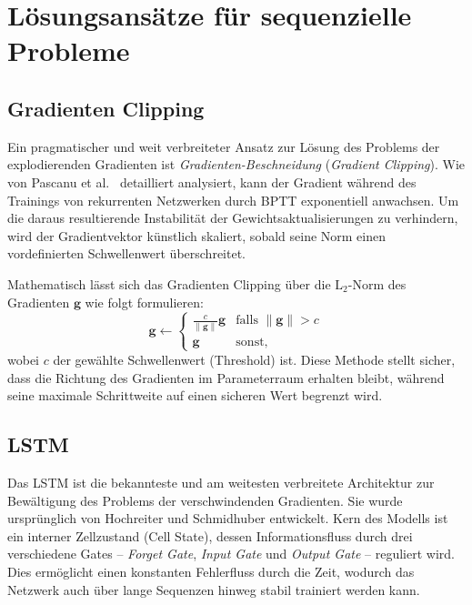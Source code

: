 \chapter{Lösungsansätze für sequenzielle Probleme}

\section{Gradienten Clipping}

Ein pragmatischer und weit verbreiteter Ansatz zur Lösung des Problems der explodierenden Gradienten ist \textit{Gradienten-Beschneidung} (\textit{Gradient Clipping}). Wie von Pascanu et al.\ \autocite{Pascanu2013} detailliert analysiert, kann der Gradient während des Trainings von rekurrenten Netzwerken durch \acs{BPTT} exponentiell anwachsen. Um die daraus resultierende Instabilität der Gewichtsaktualisierungen zu verhindern, wird der Gradientvektor künstlich skaliert, sobald seine Norm einen vordefinierten Schwellenwert überschreitet.

Mathematisch lässt sich das Gradienten Clipping über die $\text{L}_2$-Norm des Gradienten $\mathbf{g}$ wie folgt formulieren:
\begin{equation}
    \mathbf{g} \leftarrow
    \begin{cases} 
      \frac{c}{\|\mathbf{g}\|} \mathbf{g} & \text{falls } \|\mathbf{g}\| > c \\
      \mathbf{g} & \text{sonst},
    \end{cases}
\end{equation}
wobei $c$ der gewählte Schwellenwert (Threshold) ist. Diese Methode stellt sicher, dass die Richtung des Gradienten im Parameterraum erhalten bleibt, während seine maximale Schrittweite auf einen sicheren Wert begrenzt wird.

\section[LSTM]{\texorpdfstring{\acs{LSTM}}{LSTM}}

Das \ac{LSTM} ist die bekannteste und am weitesten verbreitete Architektur zur Bewältigung des Problems der verschwindenden Gradienten. Sie wurde ursprünglich von Hochreiter und Schmidhuber \autocite{Hochreiter1997} entwickelt. Kern des Modells ist ein interner Zellzustand (Cell State), dessen Informationsfluss durch drei verschiedene Gates -- \textit{Forget Gate}, \textit{Input Gate} und \textit{Output Gate} -- reguliert wird. Dies ermöglicht einen konstanten Fehlerfluss durch die Zeit, wodurch das Netzwerk auch über lange Sequenzen hinweg stabil trainiert werden kann.

